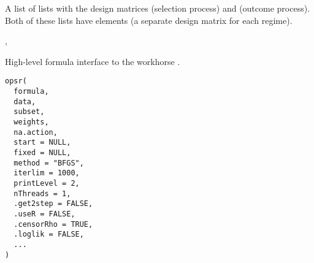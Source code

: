 \documentclass[letterpaper]{book}
\begin{document}
%
\begin{Value}
A list of lists with the design matrices  (selection process) and
 (outcome process). Both of these lists have  elements (a
separate design matrix for each regime).
\end{Value}
%
\begin{SeeAlso}
, 
\end{SeeAlso}
%
\begin{Description}
High-level formula interface to the workhorse .
\end{Description}
%
\begin{Usage}
\begin{verbatim}
opsr(
  formula,
  data,
  subset,
  weights,
  na.action,
  start = NULL,
  fixed = NULL,
  method = "BFGS",
  iterlim = 1000,
  printLevel = 2,
  nThreads = 1,
  .get2step = FALSE,
  .useR = FALSE,
  .censorRho = TRUE,
  .loglik = FALSE,
  ...
)
\end{verbatim}
\end{Usage}
%
\end{document}
